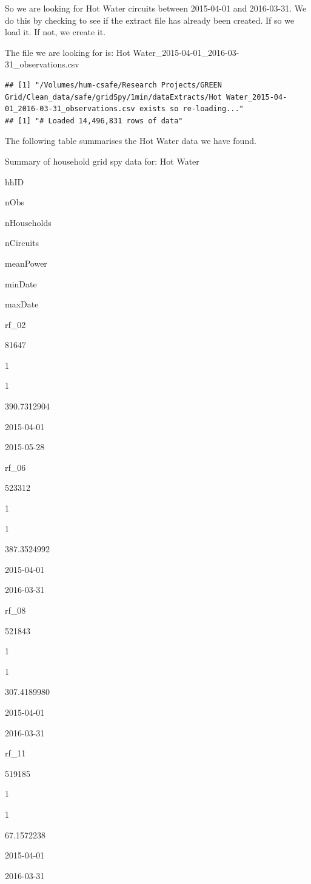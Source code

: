 \documentclass[]{article}
\begin{document}
So we are looking for Hot Water circuits between 2015-04-01 and
2016-03-31. We do this by checking to see if the extract file has
already been created. If so we load it. If not, we create it.

The file we are looking for is: Hot
Water\_2015-04-01\_2016-03-31\_observations.csv

\begin{verbatim}
## [1] "/Volumes/hum-csafe/Research Projects/GREEN Grid/Clean_data/safe/gridSpy/1min/dataExtracts/Hot Water_2015-04-01_2016-03-31_observations.csv exists so re-loading..."
## [1] "# Loaded 14,496,831 rows of data"
\end{verbatim}

The following table summarises the Hot Water data we have found.

Summary of household grid spy data for: Hot Water

hhID

nObs

nHouseholds

nCircuits

meanPower

minDate

maxDate

rf\_02

81647

1

1

390.7312904

2015-04-01

2015-05-28

rf\_06

523312

1

1

387.3524992

2015-04-01

2016-03-31

rf\_08

521843

1

1

307.4189980

2015-04-01

2016-03-31

rf\_11

519185

1

1

67.1572238

2015-04-01

2016-03-31
\end{document}
